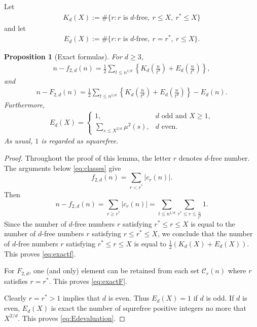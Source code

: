 \documentclass[10pt,a4paper]{amsart}
\numberwithin{equation}{section}
\newcommand{\cC}{\mathcal C}
\newcommand{\1}{\mathbf 1}
\newtheorem{proposition}[theorem]{Proposition}
\begin{document}
Let
\begin{align}
 K_d(X):=\#\{r:r\text{ is $d$-free},\ r\leq X,\ r^*\leq X\}
\label{eq:Kddef}
\end{align}
and let
\begin{align}
 E_d(X):=\#\{r:r\text{ is $d$-free},\ r=r^*,\ r\leq X\}.
\label{eq:Eddef}
\end{align}


\begin{proposition}[Exact formulas]\label{prop:exact}
For $d\geq3$,
\begin{align}
 n-f_{2,d}(n)
 =\frac12\sum_{t\leq n^{1/d}}
 \left\{
 K_d\left(\frac{n}{t^d}\right)
 +E_d\left(\frac{n}{t^d}\right)
 \right\},
\label{eq:exactf}
\end{align}
and
\begin{align}
 n-F_{2,d}(n)
 =\frac12\sum_{t\leq n^{1/d}}
 \left\{
 K_d\left(\frac{n}{t^d}\right)
 +E_d\left(\frac{n}{t^d}\right)
 \right\}-E_d(n).
\label{eq:exactF}
\end{align}
Furthermore,
\begin{align}
 E_d(X)=
 \begin{cases}
 1,&d\text{ odd and }X\geq1,\\[1mm]
 \displaystyle\sum_{s\leq X^{2/d}}\mu^2(s),&d\text{ even}.
\end{cases}
\tag{2.8}\label{eq:Edevaluation}
\end{align}
As usual, $1$ is regarded as squarefree.
\end{proposition}

\begin{proof}Throughout the proof of this lemma, the letter $r$ denotes $d$-free number. The arguments below \eqref{eq:classes} give
$$f_{2,d}(n)=\sum_{r< r^\ast}|c_r(n)|.$$
Then 
$$n-f_{2,d}(n)=\sum_{r\geq r^\ast}|c_r(n)|=\sum_{t\leq n^{1/d}}\sum_{r^\ast\leq r\leq \frac{n}{t^d}}1.$$
Since the number of $d$-free numbers $r$ satisfying $r^\ast\leq r\leq X$ is equal to the number of $d$-free numbers $r$ satisfying $r\leq r^\ast\leq X$, we conclude that
the number of $d$-free numbers $r$ satisfying $r^\ast\leq r\leq X$ is equal to $\frac{1}{2}(K_d(X)+E_d(X))$. This proves \eqref{eq:exactf}.

For
$F_{2,d}$, one (and only) element can be retained from each set $ \cC_r(n)$ where $r$ satisfies $r=r^*$. This proves \eqref{eq:exactF}. 

Clearly $r=r^\ast>1$ implies that $d$ is even. Thus $E_d(X)=1$ if $d$ is odd.
If $d$ is even, $E_d(X)$ is exact the number of squrefree positive integers no more that $X^{2/d}$. This proves
\eqref{eq:Edevaluation}.
\end{proof}
\end{document}
